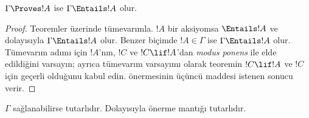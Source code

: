 



\begin{thm}[Sağlamlık]
$\Gamma\Proves!A$ ise $\Gamma \Entails !A$ olur.
\end{thm}

\begin{proof}
Teoremler üzerinde tümevarımla. $!A$ bir aksiyomsa $\Entails
!A$ ve dolayısıyla $\Gamma \Entails!A$ olur. Benzer biçimde
$!A \in \Gamma$ ise $\Gamma \Entails!A$ olur. Tümevarım adımı için $!A$'nın,
$!C$ ve $!C\lif!A$'dan \emph{modus ponens} ile elde edildiğini varsayın;
ayrıca tümevarım varsayımı olarak teoremin $!C\lif !A$ ve $!C$ için geçerli
olduğunu kabul edin.  önermesinin üçüncü
maddesi istenen sonucu verir.
\end{proof}

\begin{cor}
$\Gamma$ sağlanabilirse tutarlıdır. Dolayısıyla önerme mantığı tutarlıdır.
\end{cor}

